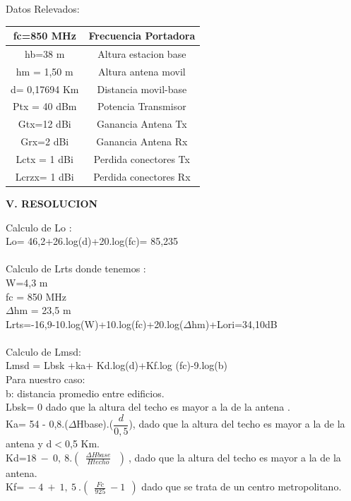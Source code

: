 \documentclass[10pt,a4paper]{article}
\begin{document}
\begin{multicols}{2}
\begin{flushleft}
Datos Relevados:\\
\end{flushleft}

\begin{center}
\begin{tabular}{|c|c|}
\hline 
fc=850 MHz & Frecuencia Portadora  \\ 
\hline 
hb=38 m & Altura estacion base  \\ 
\hline 
hm = 1,50 m & Altura antena movil \\ 
\hline 
d= 0,17694 Km & Distancia movil-base \\ 
\hline 
Ptx = 40 dBm & Potencia Transmisor \\ 
\hline 
Gtx=12 dBi & Ganancia Antena Tx \\ 
\hline 
Grx=2 dBi & Ganancia Antena Rx \\ 
\hline 
Lctx = 1 dBi & Perdida conectores Tx \\ 
\hline 
Lcrzx= 1 dBi & Perdida conectores Rx \\ 
\hline 
\end{tabular} 
\end{center}

\begin{center}
\textbf{V. RESOLUCION }
\end{center}
Calculo de Lo :\\
Lo= 46,2+26.log(d)+20.log(fc)= 85,235\\\\
Calculo de Lrts donde tenemos :\\
W=4,3 m\\
fc = 850 MHz\\
$\Delta $hm = 23,5 m\\
Lrts=-16,9-10.log(W)+10.log(fc)+20.log($\Delta$hm)+Lori=34,10dB\\
\\
Calculo de Lmsd:\\
Lmsd = Lbsk +ka+ Kd.log(d)+Kf.log (fc)-9.log(b)\\
Para nuestro caso:\\
b:  distancia promedio entre edificios.\\
Lbsk= 0 dado que la altura del techo es mayor a la de la antena .\\
Ka= 54 - 0,8.($\Delta$Hbase).($\dfrac{d}{0,5}$), dado que la altura del techo es  mayor a la de la antena y d$<$0,5 Km.\\
Kd=$ 18\ -\ 0,\ 8.\left( \ \ \frac{\Delta Hbase}{Htecho} \ \ \ \right)\ $,  dado que la altura del techo es mayor a la de la antena.\\
Kf=$\ -4\ +\ 1,\ 5\ .\left( \ \ \frac{Fc}{925} \ -1\ \ \right)$ dado que se trata de un centro metropolitano.\\


\end{multicols}
\end{document}
